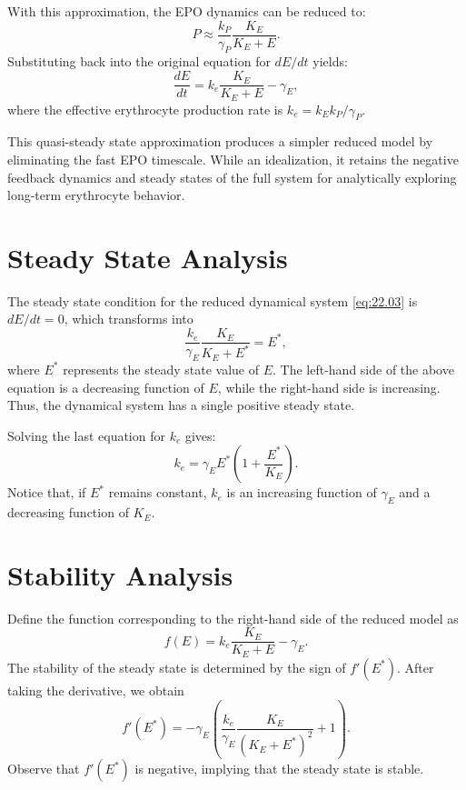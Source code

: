 With this approximation, the EPO dynamics can be reduced to:
\begin{equation*}
P \approx \frac{k_P}{\gamma_P} \frac{K_E}{K_E + E}.
\end{equation*}
Substituting back into the original equation for $dE/dt$ yields:
\begin{equation}
\frac{dE}{dt} = k_e \frac{K_E}{K_E + E} - \gamma_E, \label{eq:22.03}
\end{equation}
where the effective erythrocyte production rate is $k_e = k_E k_P / \gamma_P$.

This quasi-steady state approximation produces a simpler reduced model by eliminating the fast EPO timescale. While an idealization, it retains the negative feedback dynamics and steady states of the full system for analytically exploring long-term erythrocyte behavior.

\section{Steady State Analysis}

The steady state condition for the reduced dynamical system \eqref{eq:22.03} is $dE/dt=0$, which transforms into
\begin{equation*}
\frac{k_e}{\gamma_E} \frac{K_E}{K_E + E^*} = E^*,
\end{equation*}
where $E^*$ represents the steady state value of $E$. The left-hand side of the above equation is a decreasing function of $E$, while the right-hand side is increasing. Thus, the dynamical system has a single positive steady state.

Solving the last equation for $k_e$ gives:
\begin{equation}
k_e = \gamma_E E^* \left(1 + \frac{E^*}{K_E}\right). \label{eq:22.04}
\end{equation}
Notice that, if $E^*$ remains constant, $k_e$ is an increasing function of $\gamma_E$ and a decreasing function of $K_E$.

\section{Stability Analysis}

Define the function corresponding to the right-hand side of the reduced model as
\begin{equation*}
f(E) = k_e \frac{K_E}{K_E + E} - \gamma_E.
\end{equation*}
The stability of the steady state is determined by the sign of $f'(E^*)$. After taking the derivative, we obtain
\begin{equation*}
f'(E^*) = - \gamma_E \left(\frac{k_e}{\gamma_E} \frac{K_E}{(K_E + E^*)^2} + 1\right).
\end{equation*}
Observe that $f'(E^*)$ is negative, implying that the steady state is stable.

